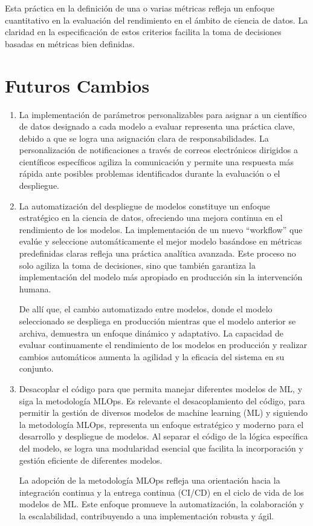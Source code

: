 Esta práctica en la definición de una o varias métricas refleja un enfoque cuantitativo en la evaluación del rendimiento en el ámbito de ciencia de datos. La claridad en la especificación de estos criterios facilita la toma de decisiones basadas en métricas bien definidas.


\section{Futuros Cambios}

\begin{enumerate}
	\item La implementación de parámetros personalizables para asignar a un científico de datos designado a cada modelo a evaluar representa una práctica clave, debido a que se logra una asignación clara de responsabilidades. La personalización de notificaciones a través de correos electrónicos dirigidos a científicos específicos agiliza la comunicación y permite una respuesta más rápida ante posibles problemas identificados durante la evaluación o el despliegue. \newpage

	\item La automatización del despliegue de modelos constituye un enfoque estratégico en la ciencia de datos, ofreciendo una mejora continua en el rendimiento de los modelos. La implementación de un nuevo “workflow” que evalúe y seleccione automáticamente el mejor modelo basándose en métricas predefinidas claras refleja una práctica analítica avanzada. Este proceso no solo agiliza la toma de decisiones, sino que también garantiza la implementación del modelo más apropiado en producción sin la intervención humana.

	De allí que, el cambio automatizado entre modelos, donde el modelo seleccionado se despliega en producción mientras que el modelo anterior se archiva, demuestra un enfoque dinámico y adaptativo. La capacidad de evaluar continuamente el rendimiento de los modelos en producción y realizar cambios automáticos aumenta la agilidad y la eficacia del sistema en su conjunto.

	\item Desacoplar el código para que permita manejar diferentes modelos de ML, y siga la metodología MLOps. Es relevante el desacoplamiento del código, para permitir la gestión de diversos modelos de machine learning (ML) y siguiendo la metodología MLOps, representa un enfoque estratégico y moderno para el desarrollo y despliegue de modelos. Al separar el código de la lógica específica del modelo, se logra una modularidad esencial que facilita la incorporación y gestión eficiente de diferentes modelos.

	La adopción de la metodología MLOps refleja una orientación hacia la integración continua y la entrega continua (CI/CD) en el ciclo de vida de los modelos de ML. Este enfoque promueve la automatización, la colaboración y la escalabilidad, contribuyendo a una implementación robusta y ágil.
\end{enumerate}



